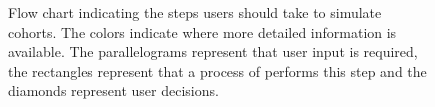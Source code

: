 \begin{figure}
\begin{tikzpicture}[node distance = 2cm, auto]
		
\end{tikzpicture}
\caption{Flow chart indicating the steps users should take to simulate cohorts. The colors indicate where more detailed information is available. The parallelograms represent that user input is required, the rectangles represent that a process of  performs this step and the diamonds represent user decisions.}%
\label{fig:flow}%
\end{figure}
